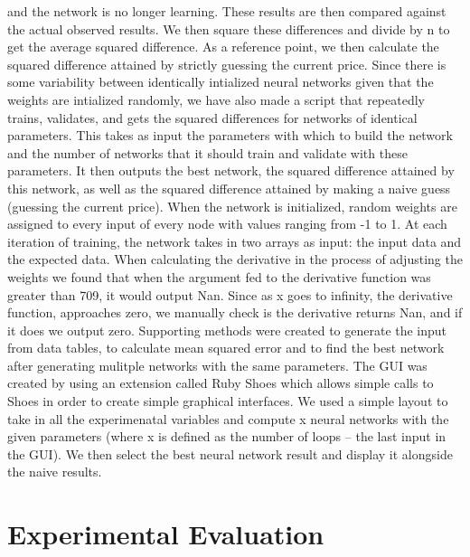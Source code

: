\documentclass[a4paper,11pt]{article}
\begin{document}
and the network is no longer learning.  These results are then compared against the actual observed results.  We then square these
differences and divide by n to get the average squared difference.  As a reference point, we then calculate the squared difference
attained by strictly guessing the current price.  
\newline \newline
Since there is some variability between identically intialized neural networks given that the weights are intialized randomly, 
we have also made a script that repeatedly trains, validates, and gets the squared differences for networks of identical 
parameters.  This takes as input the parameters with which to build the network and the number of networks that it should
train and validate with these parameters.  It then outputs the best network, the squared difference attained by this network,
as well as the squared difference attained by making a naive guess (guessing the current price).
\newline \newline
When the network is initialized, random weights are assigned to every input of every node with values ranging from -1 to 1.
At each iteration of training, the network takes in two arrays as input: the input data and the expected data.  When calculating
the derivative in the process of adjusting the weights we found that when the argument fed to the derivative function was
greater than 709, it would output Nan.  Since as x goes to infinity, the derivative function, approaches zero, we manually
check is the derivative returns Nan, and if it does we output zero.
\newline
Supporting methods were created to generate the input from data tables, to calculate mean squared error and to find the best network after generating mulitple networks with the same parameters.
\newline
The GUI was created by using an extension called Ruby Shoes which allows simple calls to Shoes in order to create simple graphical interfaces. We used a simple layout to take in all the experimenatal variables and compute x neural networks with the given parameters (where x is defined as the number of loops -- the last input in the GUI). We then select the best neural network result and display it alongside the naive results. 


\section{Experimental Evaluation}
\end{document}
